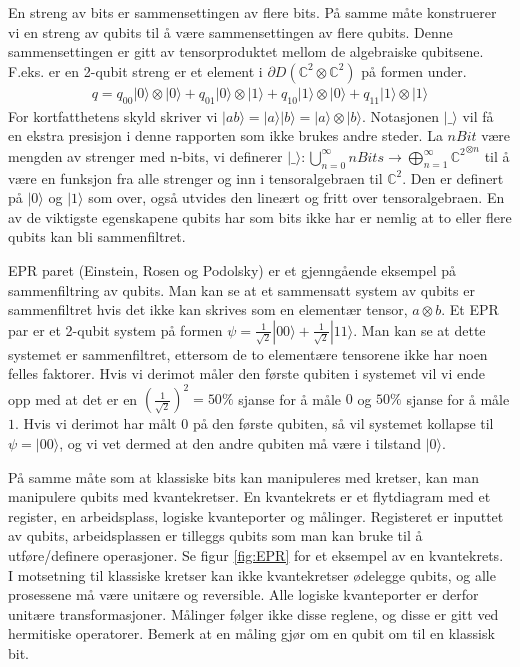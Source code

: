         En streng av bits er sammensettingen av flere bits. På samme måte konstruerer vi en streng av qubits til å være sammensettingen av flere qubits. Denne sammensettingen er gitt av tensorproduktet mellom de algebraiske qubitsene. F.eks. er en 2-qubit streng er et element i $\partial D(\mathbb{C}^2\otimes\mathbb{C}^2)$ på formen under.
        \begin{align*}
            q = q_{00}|0\rangle\otimes |0\rangle + q_{01}|0\rangle\otimes |1\rangle + q_{10}|1\rangle\otimes|0\rangle + q_{11}|1\rangle\otimes |1\rangle
        \end{align*}
        For kortfatthetens skyld skriver vi $|ab\rangle = |a\rangle|b\rangle = |a\rangle\otimes |b\rangle$. Notasjonen $|\_\rangle$ vil få en ekstra presisjon i denne rapporten som ikke brukes andre steder. La $nBit$ være mengden av strenger med n-bits, vi definerer $|\_\rangle : \bigcup_{n=0}^{\infty}nBits \rightarrow \bigoplus_{n=1}^{\infty}{\mathbb{C}^2}^{\otimes n}$ til å være en funksjon fra alle strenger og inn i tensoralgebraen til $\mathbb{C}^2$. Den er definert på $|0\rangle$ og $|1\rangle$ som over, også utvides den lineært og fritt over tensoralgebraen. En av de viktigste egenskapene qubits har som bits ikke har er nemlig at to eller flere qubits kan bli sammenfiltret.

        EPR paret (Einstein, Rosen og Podolsky) er et gjenngående eksempel på sammenfiltring av qubits. Man kan se at et sammensatt system av qubits er sammenfiltret hvis det ikke kan skrives som en elementær tensor, $a\otimes b$. Et EPR par er et 2-qubit system på formen $\psi = \frac{1}{\sqrt{2}}|00\rangle + \frac{1}{\sqrt{2}}|11\rangle$. Man kan se at dette systemet er sammenfiltret, ettersom de to elementære tensorene ikke har noen felles faktorer. Hvis vi derimot måler den første qubiten i systemet vil vi ende opp med at det er en $(\frac{1}{\sqrt{2}})^2 = 50\%$ sjanse for å måle $0$ og $50\%$ sjanse for å måle $1$. Hvis vi derimot har målt $0$ på den første qubiten, så vil systemet kollapse til $\psi = |00\rangle$, og vi vet dermed at den andre qubiten må være i tilstand $|0\rangle$.

        På samme måte som at klassiske bits kan manipuleres med kretser, kan man manipulere qubits med kvantekretser. En kvantekrets er et flytdiagram med et register, en arbeidsplass, logiske kvanteporter og målinger. Registeret er inputtet av qubits, arbeidsplassen er tilleggs qubits som man kan bruke til å utføre/definere operasjoner. Se figur \ref{fig:EPR} for et eksempel av en kvantekrets. I motsetning til klassiske kretser kan ikke kvantekretser ødelegge qubits, og alle prosessene må være unitære og reversible. Alle logiske kvanteporter er derfor unitære transformasjoner. Målinger følger ikke disse reglene, og disse er gitt ved hermitiske operatorer. Bemerk at en måling gjør om en qubit om til en klassisk bit.

